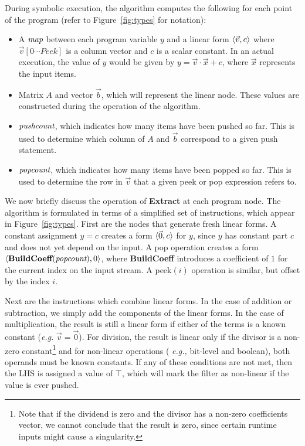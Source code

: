 During symbolic execution, the algorithm computes the following for
each point of the program (refer to Figure~\ref{fig:types} for
notation):
\begin{itemize}

\vspace{-6pt}
\item A $\mbox{\it map}$ between each program variable $y$ and a linear form
$\langle{\vec{v}}, {c}\rangle$ where $\vec{v}[0 \cdots Peek]$ is a column vector 
and $c$ is a scalar constant. In an actual execution, the value of $y$ would
be given by $y = \vec{v} \cdot \vec{x} + c$, where $\vec{x}$ 
represents the input items.
\vspace{-6pt}

\item Matrix $A$ and vector $\vec b$, which will represent the linear node.
These values are constructed during the operation of the algorithm.
\vspace{-6pt}

\item $\mbox{\it pushcount}$, which indicates how many items have been
pushed so far.  This is used to determine which column of $A$ and
$\vec{b}$ correspond to a given push statement.
\vspace{-6pt}

\item $\mbox{\it popcount}$, which indicates how many items have been popped
so far.  This is used to determine the row in $\vec{v}$ that a 
given peek or pop expression refers to.
\vspace{-6pt}

\end{itemize}

We now briefly discuss the operation of {\bf Extract} at each program
node.  The algorithm is formulated in terms of a simplified set of
instructions, which appear in Figure~\ref{fig:types}.  First are the
nodes that generate fresh linear forms.  A constant assignment $y = c$
creates a form $\langle{\vec 0}, {c}\rangle$ for $y$, since $y$ has constant part
$c$ and does not yet depend on the input.  A pop operation
creates a form $\langle{\mbox{\bf BuildCoeff}(\mbox{\it popcount})}, {0}\rangle$, where
{\bf BuildCoeff} introduces a coefficient of $1$ for the current index
on the input stream.  A peek$(i)$ operation is similar, but
offset by the index $i$.

Next are the instructions which combine linear forms.  In the case of
addition or subtraction, we simply add the components of the linear
forms.  In the case of multiplication, the result is still a linear
form if either of the terms is a known constant ({\it e.g.}
$\vec{v}=\vec{0}$).  For division, the result is linear only if the
divisor is a non-zero constant\footnote{{\small Note that if the
dividend is zero and the divisor has a non-zero coefficients vector,
we cannot conclude that the result is zero, since certain runtime
inputs might cause a singularity.}} and for non-linear operations ({\it
e.g.,} bit-level and boolean), both operands must be known constants.
If any of these conditions are not met, then the LHS is assigned a
value of $\top$, which will mark the filter as non-linear if the value
is ever pushed.

